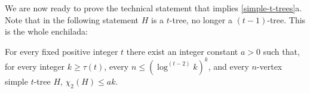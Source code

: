\documentclass[kpfonts]{patmorin}
\newcommand{\trn}{\chi_2}
\theoremstyle{named}
\newcommand{\weirdref}[2]{\cref{#1}#2}
\begin{document}


We are now ready to prove the technical statement that implies \weirdref{simple-t-trees}{a}. Note that in the following statement $H$ is a $t$-tree, no longer a $(t-1)$-tree.  This is the whole enchilada:


\begin{lem}\label{two-tree-technical}
    For every fixed positive integer $t$ there exist an integer constant $a>0$ such that, for every integer $k\ge \tau(t)$, every $n\le (\log^{(t-2)} k)^{k}$, and every $n$-vertex simple $t$-tree $H$, $\trn(H)\le ak$.
\end{lem}
\end{document}
